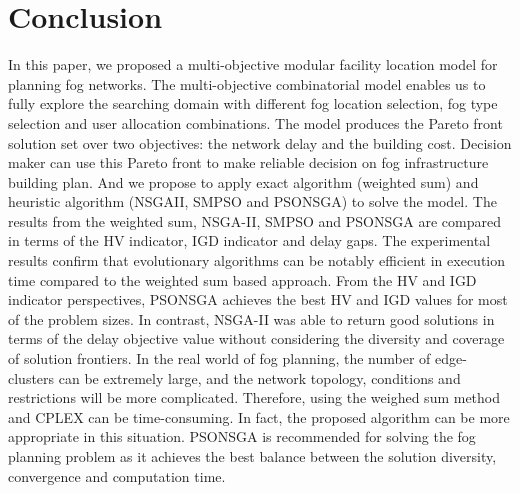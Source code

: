 \documentclass[10pt,journal,compsoc]{IEEEtran}
\begin{document}
\section{Conclusion}\label{conclu}
In this paper, we proposed a multi-objective modular facility location model for planning fog networks. The multi-objective combinatorial model enables us to fully explore the searching domain with different fog location selection, fog type selection and user allocation combinations. The model produces the Pareto front solution set over two objectives: the network delay and the building cost. Decision maker can use this Pareto front to make reliable decision on fog infrastructure building plan. 
And we propose to apply exact algorithm (weighted sum) and heuristic algorithm (NSGAII, SMPSO and PSONSGA) to solve the model. The results from the weighted sum, NSGA-II, SMPSO and PSONSGA are compared in terms of the HV indicator, IGD indicator and delay gaps. The experimental results confirm that evolutionary algorithms can be notably efficient in execution time compared to the weighted sum based approach. From the HV and IGD indicator perspectives, PSONSGA achieves the best HV and IGD values for most of the problem sizes. In contrast, NSGA-II was able to return good solutions in terms of the delay objective value without considering the diversity and coverage of solution frontiers.
In the real world of fog planning, the number of edge-clusters can be extremely large, and the network topology, conditions and restrictions will be more complicated. Therefore, using the weighed sum method and CPLEX can be time-consuming. In fact, the proposed algorithm can be more appropriate in this situation. PSONSGA is recommended for solving the fog planning problem as it achieves the best balance between the solution diversity, convergence and computation time.



\end{document}
